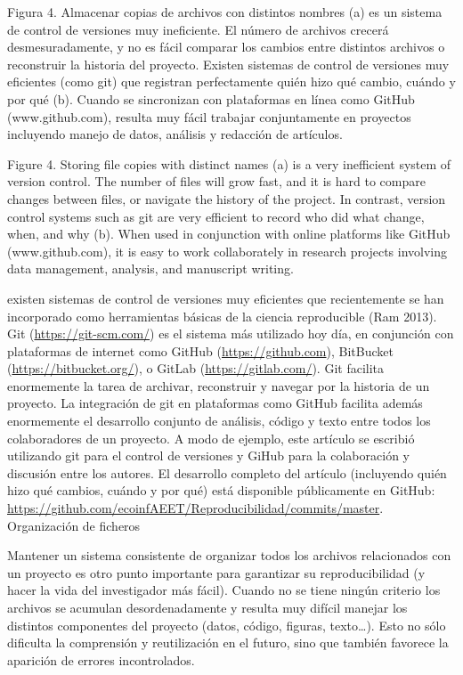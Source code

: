 \documentclass[]{tufte-handout}
\begin{document}
Figura 4. Almacenar copias de archivos con distintos nombres (a) es un
sistema de control de versiones muy ineficiente. El número de archivos
crecerá desmesuradamente, y no es fácil comparar los cambios entre
distintos archivos o reconstruir la historia del proyecto. Existen
sistemas de control de versiones muy eficientes (como git) que registran
perfectamente quién hizo qué cambio, cuándo y por qué (b). Cuando se
sincronizan con plataformas en línea como GitHub (www.github.com),
resulta muy fácil trabajar conjuntamente en proyectos incluyendo manejo
de datos, análisis y redacción de artículos.

Figure 4. Storing file copies with distinct names (a) is a very
inefficient system of version control. The number of files will grow
fast, and it is hard to compare changes between files, or navigate the
history of the project. In contrast, version control systems such as git
are very efficient to record who did what change, when, and why (b).
When used in conjunction with online platforms like GitHub
(www.github.com), it is easy to work collaborately in research projects
involving data management, analysis, and manuscript writing.

existen sistemas de control de versiones muy eficientes que
recientemente se han incorporado como herramientas básicas de la ciencia
reproducible (Ram 2013). Git (\url{https://git-scm.com/}) es el sistema
más utilizado hoy día, en conjunción con plataformas de internet como
GitHub (\url{https://github.com}), BitBucket
(\url{https://bitbucket.org/}), o GitLab (\url{https://gitlab.com/}).
Git facilita enormemente la tarea de archivar, reconstruir y navegar por
la historia de un proyecto. La integración de git en plataformas como
GitHub facilita además enormemente el desarrollo conjunto de análisis,
código y texto entre todos los colaboradores de un proyecto. A modo de
ejemplo, este artículo se escribió utilizando git para el control de
versiones y GiHub para la colaboración y discusión entre los autores. El
desarrollo completo del artículo (incluyendo quién hizo qué cambios,
cuándo y por qué) está disponible públicamente en GitHub:
\url{https://github.com/ecoinfAEET/Reproducibilidad/commits/master}.
Organización de ficheros

Mantener un sistema consistente de organizar todos los archivos
relacionados con un proyecto es otro punto importante para garantizar su
reproducibilidad (y hacer la vida del investigador más fácil). Cuando no
se tiene ningún criterio los archivos se acumulan desordenadamente y
resulta muy difícil manejar los distintos componentes del proyecto
(datos, código, figuras, texto\ldots). Esto no sólo dificulta la
comprensión y reutilización en el futuro, sino que también favorece la
aparición de errores incontrolados.
\end{document}
